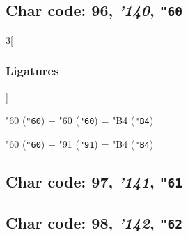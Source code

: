 \documentclass{article}
\newlength{\maxcharwidth}
\begin{document}
\subsection{Char code: 96, {\it'140}, {\tt"60}}
\label{char_96}


\begin{multicols}{3}[\subsubsection{Ligatures}]

{\testfont\char"60\noboundary} ({\tt"60}) + {\testfont\char"60\noboundary} ({\tt"60}) = {\testfont\char"B4\noboundary} ({\tt"B4}) 

{\testfont\char"60\noboundary} ({\tt"60}) + {\testfont\char"91\noboundary} ({\tt"91}) = {\testfont\char"B4\noboundary} ({\tt"B4}) 

\end{multicols}

\subsection{Char code: 97, {\it'141}, {\tt"61}}
\label{char_97}


\subsection{Char code: 98, {\it'142}, {\tt"62}}
\label{char_98}

\end{document}
